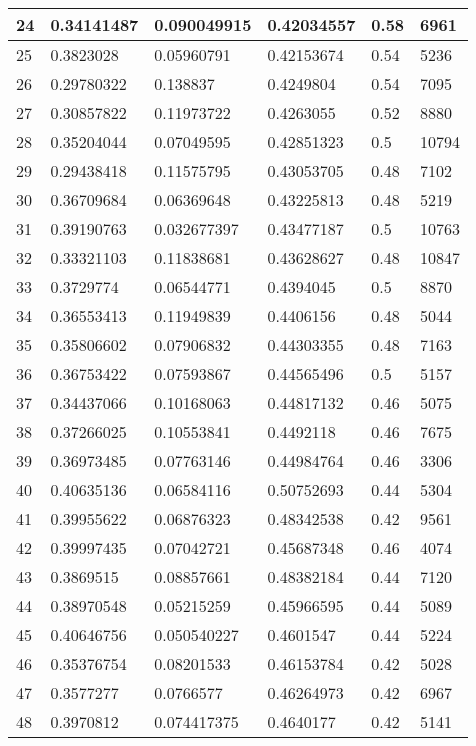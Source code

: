 \begin{longtable}{|l|l|l|l|l|l|}
24 & 0.34141487 & 0.090049915 & 0.42034557 & 0.58 & 6961 \\ \hline 
25 & 0.3823028 & 0.05960791 & 0.42153674 & 0.54 & 5236 \\ \hline 
26 & 0.29780322 & 0.138837 & 0.4249804 & 0.54 & 7095 \\ \hline 
27 & 0.30857822 & 0.11973722 & 0.4263055 & 0.52 & 8880 \\ \hline 
28 & 0.35204044 & 0.07049595 & 0.42851323 & 0.5 & 10794 \\ \hline 
29 & 0.29438418 & 0.11575795 & 0.43053705 & 0.48 & 7102 \\ \hline 
30 & 0.36709684 & 0.06369648 & 0.43225813 & 0.48 & 5219 \\ \hline 
31 & 0.39190763 & 0.032677397 & 0.43477187 & 0.5 & 10763 \\ \hline 
32 & 0.33321103 & 0.11838681 & 0.43628627 & 0.48 & 10847 \\ \hline 
33 & 0.3729774 & 0.06544771 & 0.4394045 & 0.5 & 8870 \\ \hline 
34 & 0.36553413 & 0.11949839 & 0.4406156 & 0.48 & 5044 \\ \hline 
35 & 0.35806602 & 0.07906832 & 0.44303355 & 0.48 & 7163 \\ \hline 
36 & 0.36753422 & 0.07593867 & 0.44565496 & 0.5 & 5157 \\ \hline 
37 & 0.34437066 & 0.10168063 & 0.44817132 & 0.46 & 5075 \\ \hline 
38 & 0.37266025 & 0.10553841 & 0.4492118 & 0.46 & 7675 \\ \hline 
39 & 0.36973485 & 0.07763146 & 0.44984764 & 0.46 & 3306 \\ \hline 
40 & 0.40635136 & 0.06584116 & 0.50752693 & 0.44 & 5304 \\ \hline 
41 & 0.39955622 & 0.06876323 & 0.48342538 & 0.42 & 9561 \\ \hline 
42 & 0.39997435 & 0.07042721 & 0.45687348 & 0.46 & 4074 \\ \hline 
43 & 0.3869515 & 0.08857661 & 0.48382184 & 0.44 & 7120 \\ \hline 
44 & 0.38970548 & 0.05215259 & 0.45966595 & 0.44 & 5089 \\ \hline 
45 & 0.40646756 & 0.050540227 & 0.4601547 & 0.44 & 5224 \\ \hline 
46 & 0.35376754 & 0.08201533 & 0.46153784 & 0.42 & 5028 \\ \hline 
47 & 0.3577277 & 0.0766577 & 0.46264973 & 0.42 & 6967 \\ \hline 
48 & 0.3970812 & 0.074417375 & 0.4640177 & 0.42 & 5141 \\ \hline 

\end{longtable}
